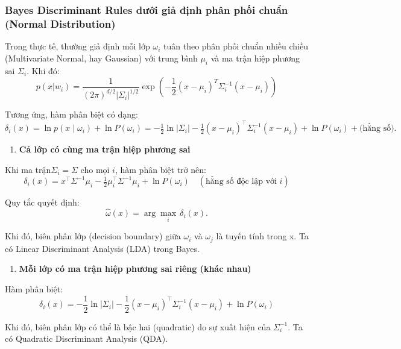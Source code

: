 \documentclass[
  a4paper,
]{article}
\providecommand{\tightlist}{%
  \setlength{\itemsep}{0pt}\setlength{\parskip}{0pt}}
\begin{document}
\subsubsection{Bayes Discriminant Rules dưới giả định phân phối chuẩn
(Normal
Distribution)}\label{bayes-discriminant-rules-dux1b0ux1edbi-giux1ea3-ux111ux1ecbnh-phuxe2n-phux1ed1i-chuux1ea9n-normal-distribution}

Trong thực tế, thường giả định mỗi lớp \(\omega_i\) tuân theo phân phối
chuẩn nhiều chiều (Multivariate Normal, hay Gaussian) với trung bình
\(\mu_i\) và ma trận hiệp phương sai \(\Sigma_i\). Khi đó: \[
p(x|w_i) = \frac{1}{(2\pi)^{d/2} |\Sigma_i|^{1/2}} \exp\left(-\frac{1}{2}(x-\mu_i)^T \Sigma_i^{-1} (x-\mu_i)\right)
\]

Tương ứng, hàm phân biệt có dạng: \[\delta_i(x)
= \ln p(x \mid \omega_i)
  + \ln P(\omega_i)
= -\tfrac{1}{2} \ln \lvert \Sigma_i \rvert
  - \tfrac{1}{2} (x - \mu_i)^\top \Sigma_i^{-1} (x - \mu_i)
  + \ln P(\omega_i)
  + \text{(hằng số)}.\]

\begin{enumerate}
\def\labelenumi{\arabic{enumi}.}
\tightlist
\item
  \textbf{Cả lớp có cùng ma trận hiệp phương sai}
\end{enumerate}

Khi ma trận\(\Sigma_i = \Sigma\) cho mọi \(i\), hàm phân biệt trở nên:
\[\delta_i(x) 
  = x^\top \Sigma^{-1} \mu_i 
    - \tfrac{1}{2} \mu_i^\top \Sigma^{-1} \mu_i 
    + \ln P(\omega_i) 
    \quad (\text{hằng số độc lập với } i)\]

Quy tắc quyết định: \[\hat{\omega}(x) = \arg\max_i \, \delta_i(x).\]

Khi đó, biên phân lớp (decision boundary) giữa \(\omega_i\) và
\(\omega_j\) là tuyến tính trong x. Ta có Linear Discriminant Analysis
(LDA) trong Bayes.

\begin{enumerate}
\def\labelenumi{\arabic{enumi}.}
\setcounter{enumi}{1}
\tightlist
\item
  \textbf{Mỗi lớp có ma trận hiệp phương sai riêng (khác nhau)}
\end{enumerate}

Hàm phân biệt: \[\delta_i(x) 
  = -\frac{1}{2} \ln \lvert \Sigma_i \rvert 
    - \frac{1}{2} (x - \mu_i)^\top \Sigma_i^{-1} (x - \mu_i) 
    + \ln P(\omega_i)\]

Khi đó, biên phân lớp có thể là bậc hai (quadratic) do sự xuất hiện của
\(\Sigma_i^{-1}\). Ta có Quadratic Discriminant Analysis (QDA).
\end{document}
